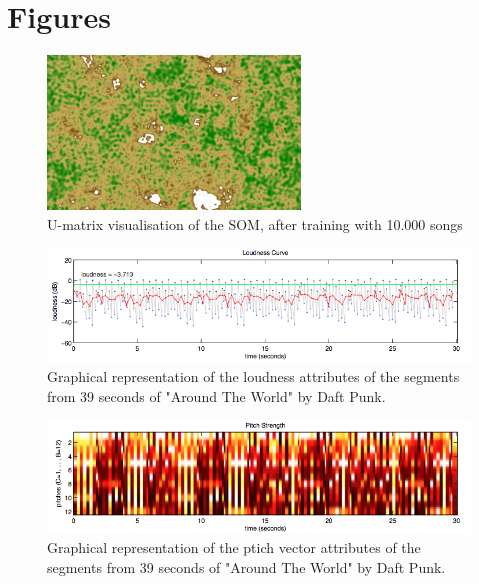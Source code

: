 \section{Figures} %
\label{sec:list_of_figures}


\begin{figure}[h]
    \centering
    \includegraphics[angle=90, width=0.6\textwidth]{figures/map.jpg}
    \caption{U-matrix visualisation of the SOM, after training with 10.000 songs}
    \label{fig:map}
\end{figure}

\begin{figure}[h]
    \centering
    \includegraphics[width=\textwidth]{figures/loudness.jpg}
    \caption{Graphical representation of the loudness attributes of the segments from 39 seconds of "Around The World" by Daft Punk.}
    \label{fig:loudness}
\end{figure}

\begin{figure}[h]
    \centering
    \includegraphics[width=\textwidth]{figures/pitch.jpg}
    \caption{Graphical representation of the ptich vector attributes of the segments from 39 seconds of "Around The World" by Daft Punk.}
    \label{fig:pitch}
\end{figure}

